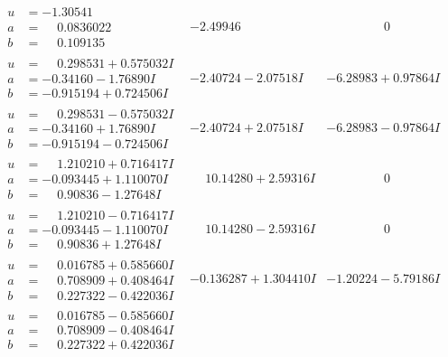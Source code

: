 \documentclass[1p]{elsarticle_modified}
\theoremstyle{definition}
\begin{document}
$$\begin{array}{c|c|c}
\begin{aligned}
u &= -1.30541\phantom{ +0.000000I} \\
a &= \phantom{-}0.0836022\phantom{ +0.000000I} \\
b &= \phantom{-}0.109135\phantom{ +0.000000I}\end{aligned}
 & -2.49946\phantom{ +0.000000I} & \phantom{-0.000000 } 0 \\ \hline\begin{aligned}
u &= \phantom{-}0.298531 + 0.575032 I \\
a &= -0.34160 - 1.76890 I \\
b &= -0.915194 + 0.724506 I\end{aligned}
 & -2.40724 - 2.07518 I & -6.28983 + 0.97864 I \\ \hline\begin{aligned}
u &= \phantom{-}0.298531 - 0.575032 I \\
a &= -0.34160 + 1.76890 I \\
b &= -0.915194 - 0.724506 I\end{aligned}
 & -2.40724 + 2.07518 I & -6.28983 - 0.97864 I \\ \hline\begin{aligned}
u &= \phantom{-}1.210210 + 0.716417 I \\
a &= -0.093445 + 1.110070 I \\
b &= \phantom{-}0.90836 - 1.27648 I\end{aligned}
 & \phantom{-}10.14280 + 2.59316 I & \phantom{-0.000000 } 0 \\ \hline\begin{aligned}
u &= \phantom{-}1.210210 - 0.716417 I \\
a &= -0.093445 - 1.110070 I \\
b &= \phantom{-}0.90836 + 1.27648 I\end{aligned}
 & \phantom{-}10.14280 - 2.59316 I & \phantom{-0.000000 } 0 \\ \hline\begin{aligned}
u &= \phantom{-}0.016785 + 0.585660 I \\
a &= \phantom{-}0.708909 + 0.408464 I \\
b &= \phantom{-}0.227322 - 0.422036 I\end{aligned}
 & -0.136287 + 1.304410 I & -1.20224 - 5.79186 I \\ \hline\begin{aligned}
u &= \phantom{-}0.016785 - 0.585660 I \\
a &= \phantom{-}0.708909 - 0.408464 I \\
b &= \phantom{-}0.227322 + 0.422036 I\end{aligned}

\end{array}$$
\end{document}
